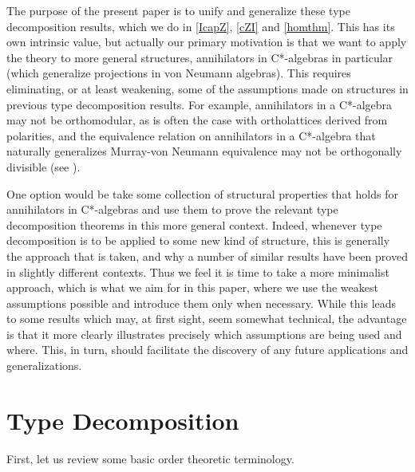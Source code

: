 \documentclass{amsart}
\theoremstyle{definition}
\numberwithin{equation}{section}
\begin{document}
The purpose of the present paper is to unify and generalize these type decomposition results, which we do in \autoref{IcapZ}, \autoref{cZI} and \autoref{homthm}.  This has its own intrinsic value, but actually our primary motivation is that we want to apply the theory to more general structures, annihilators in C*-algebras in particular (which generalize projections in von Neumann algebras).  This requires eliminating, or at least weakening, some of the assumptions made on structures in previous type decomposition results.  For example, annihilators in a C*-algebra may not be orthomodular, as is often the case with ortholattices derived from polarities, and the equivalence relation on annihilators in a C*-algebra that naturally generalizes Murray-von Neumann equivalence may not be orthogonally divisible (see \cite{Bice2014}).

One option would be take some collection of structural properties that holds for annihilators in C*-algebras and use them to prove the relevant type decomposition theorems in this more general context.  Indeed, whenever type decomposition is to be applied to some new kind of structure, this is generally the approach that is taken, and why a number of similar results have been proved in slightly different contexts.  Thus we feel it is time to take a more minimalist approach, which is what we aim for in this paper, where we use the weakest assumptions possible and introduce them only when necessary.  While this leads to some results which may, at first sight, seem somewhat technical, the advantage is that it more clearly illustrates precisely which assumptions are being used and where.  This, in turn, should facilitate the discovery of any future applications and generalizations.











\section{Type Decomposition}\label{TD}


First, let us review some basic order theoretic terminology.
\end{document}
